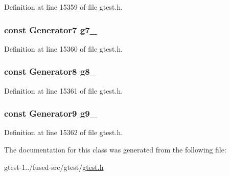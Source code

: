 \-Definition at line 15359 of file gtest.\-h.

\hypertarget{classtesting_1_1internal_1_1CartesianProductHolder10_afceade55d34273936f6cb3d7e4833d1b}{
\subsubsection[{g7\-\_\-}]{\setlength{\rightskip}{0pt plus 5cm}const \-Generator7 {\bf g7\-\_\-}}}\label{db/df3/classtesting_1_1internal_1_1CartesianProductHolder10_afceade55d34273936f6cb3d7e4833d1b}


\-Definition at line 15360 of file gtest.\-h.

\hypertarget{classtesting_1_1internal_1_1CartesianProductHolder10_a33efc612232313b29b814adcffee62e6}{
\subsubsection[{g8\-\_\-}]{\setlength{\rightskip}{0pt plus 5cm}const \-Generator8 {\bf g8\-\_\-}}}\label{db/df3/classtesting_1_1internal_1_1CartesianProductHolder10_a33efc612232313b29b814adcffee62e6}


\-Definition at line 15361 of file gtest.\-h.

\hypertarget{classtesting_1_1internal_1_1CartesianProductHolder10_ab18e76dd6bb0c7782e0fc18c04b82063}{
\subsubsection[{g9\-\_\-}]{\setlength{\rightskip}{0pt plus 5cm}const \-Generator9 {\bf g9\-\_\-}}}\label{db/df3/classtesting_1_1internal_1_1CartesianProductHolder10_ab18e76dd6bb0c7782e0fc18c04b82063}


\-Definition at line 15362 of file gtest.\-h.



\-The documentation for this class was generated from the following file\-:\begin{DoxyCompactItemize}
\item 
gtest-\/1../fused-\/src/gtest/\hyperlink{fused-src_2gtest_2gtest_8h}{gtest.\-h}\end{DoxyCompactItemize}
